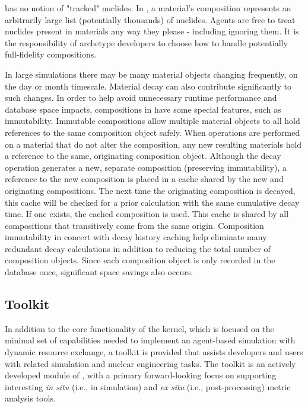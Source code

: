 \Cyclus has no notion of "tracked" nuclides.  In \Cyclus, a  material's
composition represents an arbitrarily large list (potentially thousands) of
nuclides.  Agents are free to treat nuclides present in materials any way they
please - including ignoring them.  It is the responsibility of archetype
developers to choose how to handle potentially full-fidelity compositions.

In large simulations there may be many material objects changing frequently, on 
the day or month timescale.
Material decay can also contribute significantly to such changes.  In order to
help avoid unnecessary runtime performance and database space impacts,
compositions in \Cyclus have some special features, such as immutability.
Immutable compositions allow multiple material objects to all hold
references to the same composition object safely.  When operations are
performed on a material that do not alter the composition, any new resulting
materials hold a reference to the same, originating composition object.
Although the decay operation generates a new, separate composition (preserving
immutability), a reference to the new composition is placed in a cache shared
by the new and originating compositions. The next time the originating
composition is decayed, this cache will be checked for a prior calculation
with the same cumulative decay time.  If one exists, the cached composition is
used.  This cache is shared by all compositions that transitively come from
the same origin.  Composition immutability in concert with decay history
caching help eliminate many redundant decay calculations in addition to
reducing the total number of composition objects.  Since each composition
object is only recorded in the database once, significant space savings also
occurs. 

\subsection{Toolkit}

In addition to the core functionality of the \Cyclus kernel, which is focused on
the minimal set of capabilities needed to implement an agent-based simulation
with dynamic resource exchange, a toolkit is provided that assists developers
and users with related simulation and nuclear engineering tasks. The toolkit is
an actively developed module of \Cyclus, with a primary forward-looking
focus on supporting interesting \textit{in situ} (i.e., in simulation) and
\textit{ex situ} (i.e., post-processing) metric analysis tools. 

